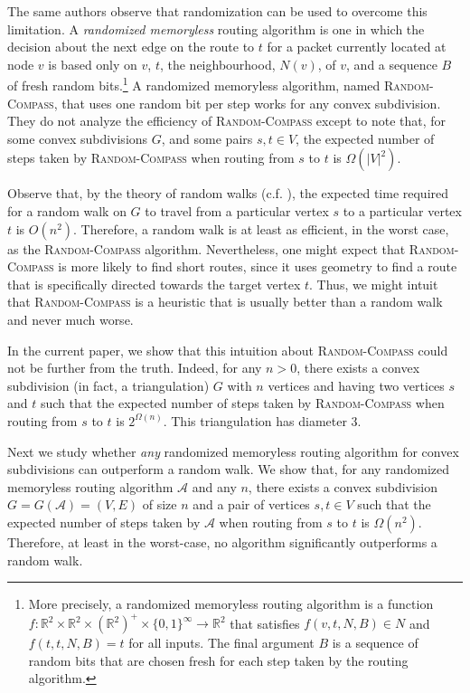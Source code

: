 \documentclass [letterpaper] {patmorin}
\newcommand{\R}{\mathbb{R}}
\begin{document}
The same authors \cite{bose02,bose04} observe that randomization can be used to overcome this limitation.  A \emph{randomized memoryless} routing algorithm is one in which the decision about the next edge on the route to $t$ for a packet currently located at node $v$ is based only on $v$, $t$, the neighbourhood, $N(v)$, of $v$, and a sequence $B$ of fresh random bits.\footnote{More precisely, a randomized memoryless routing algorithm is a function $f:\R^2\times\R^2\times(\R^2)^+\times\{0,1\}^\infty\rightarrow \R^2$ that satisfies $f(v,t,N,B) \in N$ and $f(t,t,N,B) = t$ for all inputs.  The final argument $B$ is a sequence of random bits that are chosen fresh for each step taken by the routing algorithm.} A randomized memoryless algorithm, named \textsc{Random-Compass}, that uses one random bit per step works for any convex subdivision. They do not analyze the efficiency of \textsc{Random-Compass} except to note that, for some convex subdivisions $G$, and some pairs $s,t\in V$, the expected number of steps taken by \textsc{Random-Compass} when routing from $s$ to $t$ is $\Omega(|V|^2)$.  

Observe that, by the theory of random walks (c.f. \cite[Theorem~6.6]{mr95}), the expected time required for a random walk on $G$ to travel from a particular vertex $s$ to a particular vertex $t$ is $O(n^2)$.  Therefore, a random walk is at least as efficient, in the worst case, as the \textsc{Random-Compass} algorithm. Nevertheless, one might expect that \textsc{Random-Compass} is more likely to find short routes, since it uses geometry to find a route that is specifically directed towards the target vertex $t$.  Thus, we might intuit that \textsc{Random-Compass} is a heuristic that is usually better than a random walk and never much worse.

In the current paper, we show that this intuition about \textsc{Random-Compass} could not be further from the truth.  Indeed, for any $n>0$, there exists a convex subdivision (in fact, a triangulation) $G$ with $n$ vertices and having two vertices $s$ and $t$ such that the expected number of steps taken by \textsc{Random-Compass} when routing from $s$ to $t$ is $2^{\Omega(n)}$. This triangulation has diameter 3.

Next we study whether \emph{any} randomized memoryless routing algorithm for convex subdivisions can outperform a random walk.  We show that, for any randomized memoryless routing algorithm $\mathcal{A}$ and any $n$, there exists a convex subdivision $G=G(\mathcal{A})=(V,E)$ of size $n$ and a pair of vertices $s,t\in V$ such that the expected number of steps taken by $\mathcal{A}$ when routing from $s$ to $t$ is $\Omega(n^2)$.  Therefore, at least in the worst-case, no algorithm significantly outperforms a random walk.
\end{document}
